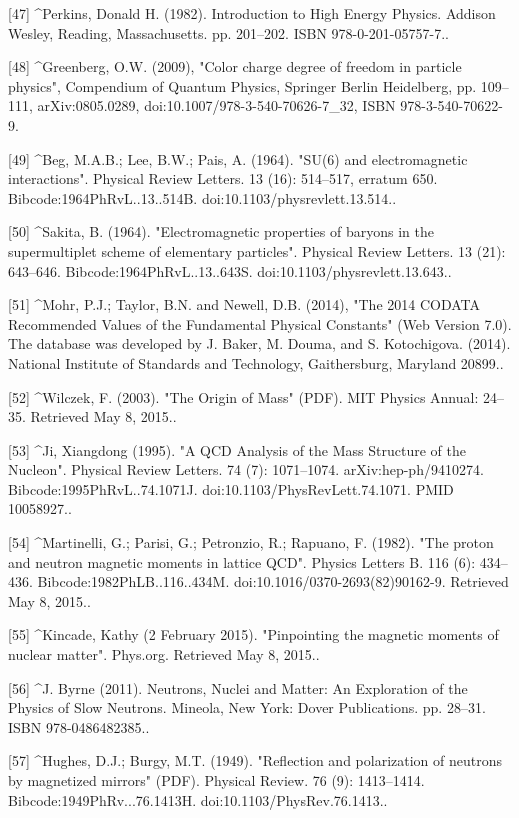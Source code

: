 [47]
^Perkins, Donald H. (1982). Introduction to High Energy Physics. Addison Wesley, Reading, Massachusetts. pp. 201–202. ISBN 978-0-201-05757-7..

[48]
^Greenberg, O.W. (2009), "Color charge degree of freedom in particle physics", Compendium of Quantum Physics, Springer Berlin Heidelberg, pp. 109–111, arXiv:0805.0289, doi:10.1007/978-3-540-70626-7_32, ISBN 978-3-540-70622-9.

[49]
^Beg, M.A.B.; Lee, B.W.; Pais, A. (1964). "SU(6) and electromagnetic interactions". Physical Review Letters. 13 (16): 514–517, erratum 650. Bibcode:1964PhRvL..13..514B. doi:10.1103/physrevlett.13.514..

[50]
^Sakita, B. (1964). "Electromagnetic properties of baryons in the supermultiplet scheme of elementary particles". Physical Review Letters. 13 (21): 643–646. Bibcode:1964PhRvL..13..643S. doi:10.1103/physrevlett.13.643..

[51]
^Mohr, P.J.; Taylor, B.N. and Newell, D.B. (2014), "The 2014 CODATA Recommended Values of the Fundamental Physical Constants" (Web Version 7.0). The database was developed by J. Baker, M. Douma, and S. Kotochigova. (2014). National Institute of Standards and Technology, Gaithersburg, Maryland 20899..

[52]
^Wilczek, F. (2003). "The Origin of Mass" (PDF). MIT Physics Annual: 24–35. Retrieved May 8, 2015..

[53]
^Ji, Xiangdong (1995). "A QCD Analysis of the Mass Structure of the Nucleon". Physical Review Letters. 74 (7): 1071–1074. arXiv:hep-ph/9410274. Bibcode:1995PhRvL..74.1071J. doi:10.1103/PhysRevLett.74.1071. PMID 10058927..

[54]
^Martinelli, G.; Parisi, G.; Petronzio, R.; Rapuano, F. (1982). "The proton and neutron magnetic moments in lattice QCD". Physics Letters B. 116 (6): 434–436. Bibcode:1982PhLB..116..434M. doi:10.1016/0370-2693(82)90162-9. Retrieved May 8, 2015..

[55]
^Kincade, Kathy (2 February 2015). "Pinpointing the magnetic moments of nuclear matter". Phys.org. Retrieved May 8, 2015..

[56]
^J. Byrne (2011). Neutrons, Nuclei and Matter: An Exploration of the Physics of Slow Neutrons. Mineola, New York: Dover Publications. pp. 28–31. ISBN 978-0486482385..

[57]
^Hughes, D.J.; Burgy, M.T. (1949). "Reflection and polarization of neutrons by magnetized mirrors" (PDF). Physical Review. 76 (9): 1413–1414. Bibcode:1949PhRv...76.1413H. doi:10.1103/PhysRev.76.1413..

